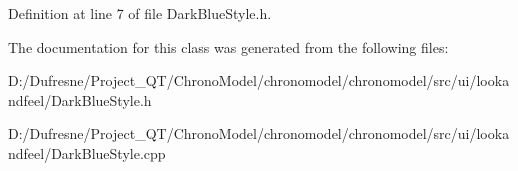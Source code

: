 Definition at line 7 of file Dark\-Blue\-Style.\-h.



The documentation for this class was generated from the following files\-:\begin{DoxyCompactItemize}
\item 
D\-:/\-Dufresne/\-Project\-\_\-\-Q\-T/\-Chrono\-Model/chronomodel/chronomodel/src/ui/lookandfeel/Dark\-Blue\-Style.\-h\item 
D\-:/\-Dufresne/\-Project\-\_\-\-Q\-T/\-Chrono\-Model/chronomodel/chronomodel/src/ui/lookandfeel/Dark\-Blue\-Style.\-cpp\end{DoxyCompactItemize}
